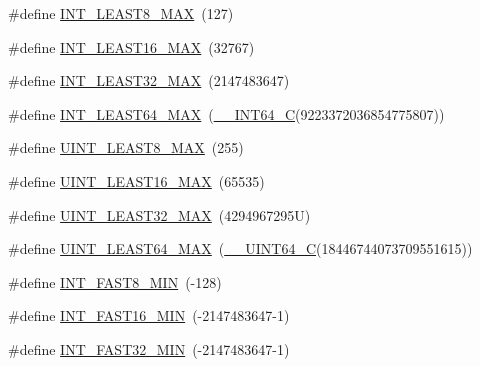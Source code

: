 \begin{DoxyCompactItemize}
\item 
\#define \hyperlink{win_2_l_a_d_s_p_a__plugins-win_2glibc__includes_2stdint_8h_aa05109908fb2770f632d2b646b9f85bf}{I\+N\+T\+\_\+\+L\+E\+A\+S\+T8\+\_\+\+M\+AX}~(127)
\item 
\#define \hyperlink{win_2_l_a_d_s_p_a__plugins-win_2glibc__includes_2stdint_8h_a7eb2a8e2a1c65d6c9ad0f86154890baa}{I\+N\+T\+\_\+\+L\+E\+A\+S\+T16\+\_\+\+M\+AX}~(32767)
\item 
\#define \hyperlink{win_2_l_a_d_s_p_a__plugins-win_2glibc__includes_2stdint_8h_a5618711a0a54f722190a3a1219e278c2}{I\+N\+T\+\_\+\+L\+E\+A\+S\+T32\+\_\+\+M\+AX}~(2147483647)
\item 
\#define \hyperlink{win_2_l_a_d_s_p_a__plugins-win_2glibc__includes_2stdint_8h_a35d0f98a2e507fd1be779d49da92724e}{I\+N\+T\+\_\+\+L\+E\+A\+S\+T64\+\_\+\+M\+AX}~(\hyperlink{win_2_l_a_d_s_p_a__plugins-win_2glibc__includes_2stdint_8h_a4b8971e411b88166747d2a3c2425eaee}{\+\_\+\+\_\+\+I\+N\+T64\+\_\+C}(9223372036854775807))
\item 
\#define \hyperlink{win_2_l_a_d_s_p_a__plugins-win_2glibc__includes_2stdint_8h_a2a80bde77ee1698d0f42f334adad4f2b}{U\+I\+N\+T\+\_\+\+L\+E\+A\+S\+T8\+\_\+\+M\+AX}~(255)
\item 
\#define \hyperlink{win_2_l_a_d_s_p_a__plugins-win_2glibc__includes_2stdint_8h_a6ef6a1a518bbf516ca8b0180b11c358f}{U\+I\+N\+T\+\_\+\+L\+E\+A\+S\+T16\+\_\+\+M\+AX}~(65535)
\item 
\#define \hyperlink{win_2_l_a_d_s_p_a__plugins-win_2glibc__includes_2stdint_8h_a70cad8bacc9a6db301e1cdc86cc8d571}{U\+I\+N\+T\+\_\+\+L\+E\+A\+S\+T32\+\_\+\+M\+AX}~(4294967295\+U)
\item 
\#define \hyperlink{win_2_l_a_d_s_p_a__plugins-win_2glibc__includes_2stdint_8h_aab530113fa96e280e49c3c138b0f917d}{U\+I\+N\+T\+\_\+\+L\+E\+A\+S\+T64\+\_\+\+M\+AX}~(\hyperlink{win_2_l_a_d_s_p_a__plugins-win_2glibc__includes_2stdint_8h_a405cee4934ed56c9a4aa4e7dc4380bd2}{\+\_\+\+\_\+\+U\+I\+N\+T64\+\_\+C}(18446744073709551615))
\item 
\#define \hyperlink{win_2_l_a_d_s_p_a__plugins-win_2glibc__includes_2stdint_8h_aad8fb982cb19143efd5ee9a1a7a89390}{I\+N\+T\+\_\+\+F\+A\+S\+T8\+\_\+\+M\+IN}~(-\/128)
\item 
\#define \hyperlink{win_2_l_a_d_s_p_a__plugins-win_2glibc__includes_2stdint_8h_a169460a4e2a79138723d68d99372d958}{I\+N\+T\+\_\+\+F\+A\+S\+T16\+\_\+\+M\+IN}~(-\/2147483647-\/1)
\item 
\#define \hyperlink{win_2_l_a_d_s_p_a__plugins-win_2glibc__includes_2stdint_8h_ad93df1652ed0635513d5efe4f1219926}{I\+N\+T\+\_\+\+F\+A\+S\+T32\+\_\+\+M\+IN}~(-\/2147483647-\/1)

\end{DoxyCompactItemize}
